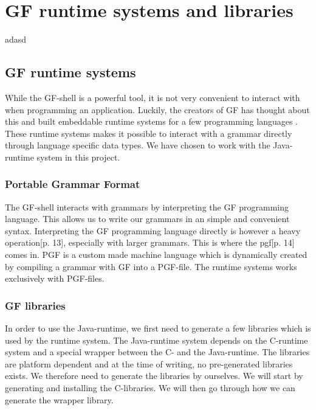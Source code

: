 \chapter{GF runtime systems and libraries}\label{ch:appendix-a}
adasd
\section{GF runtime systems}

While the GF-shell is a powerful tool, it is not very convenient to interact with when programming an application. Luckily, the creators of GF has thought about this and built embeddable runtime systems for a few programming languages \cite[p. 3]{angelov:2011}. These runtime systems makes it possible to interact with a grammar directly through language specific data types. We have chosen to work with the Java-runtime system in this project.

\subsection{Portable Grammar Format}
The GF-shell interacts with grammars by interpreting the GF programming language. This allows us to write our grammars in an simple and convenient syntax. Interpreting the GF programming language directly is however a heavy operation\cite{angelov:2011}[p. 13], especially with larger grammars. This is where the \ac{pgf}\cite{angelov:2011}[p. 14] comes in. PGF is a custom made machine language which is dynamically created by compiling a grammar with GF into a PGF-file. The runtime systems works exclusively with PGF-files.

\subsection{GF libraries}
In order to use the Java-runtime, we first need to generate a few libraries which is used by the runtime system. The Java-runtime system depends on the C-runtime system and a special wrapper between the C- and the Java-runtime. The libraries are platform dependent and at the time of writing, no pre-generated libraries exists. We therefore need to generate the libraries by ourselves. We will start by generating and installing the C-libraries. We will then go through how we can generate the wrapper library.

